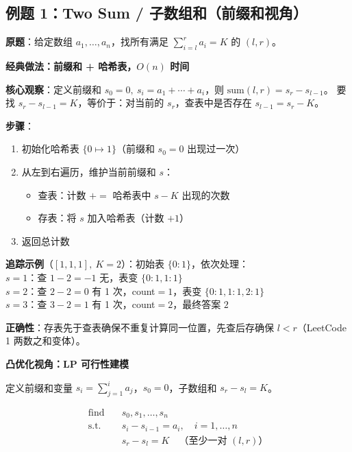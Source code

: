 \documentclass[12pt, a4paper]{ctexart}
\begin{document}
\subsection{例题 1：Two Sum / 子数组和（前缀和视角）}

\begin{blackboard}

\textbf{原题}：给定数组 $a_1, \ldots, a_n$，找所有满足 $\sum_{i=l}^{r} a_i = K$ 的 $(l,r)$。

\textbf{经典做法：前缀和 + 哈希表，$O(n)$ 时间}

\textbf{核心观察}：定义前缀和 $s_0=0,\ s_i = a_1+\cdots+a_i$，则 $\text{sum}(l,r) = s_r - s_{l-1}$。
要找 $s_r - s_{l-1} = K$，等价于：对当前的 $s_r$，查表中是否存在 $s_{l-1} = s_r - K$。

\textbf{步骤}：
\begin{enumerate}
    \item 初始化哈希表 $\{0 \mapsto 1\}$（前缀和 $s_0=0$ 出现过一次）
    \item 从左到右遍历，维护当前前缀和 $s$：
        \begin{itemize}
            \item 查表：计数 $+=$ 哈希表中 $s - K$ 出现的次数
            \item 存表：将 $s$ 加入哈希表（计数 $+1$）
        \end{itemize}
    \item 返回总计数
\end{enumerate}

\textbf{追踪示例}（$[1,1,1],\ K=2$）：初始表 $\{0\!:\!1\}$，依次处理：\\
\quad $s=1$：查 $1-2=-1$ 无，表变 $\{0\!:\!1,1\!:\!1\}$\\
\quad $s=2$：查 $2-2=0$ 有 1 次，count$=1$，表变 $\{0\!:\!1,1\!:\!1,2\!:\!1\}$\\
\quad $s=3$：查 $3-2=1$ 有 1 次，count$=2$，最终答案 $2$

\textbf{正确性}：存表先于查表确保不重复计算同一位置，先查后存确保 $l < r$（LeetCode 1 两数之和变体）。

\textbf{凸优化视角：LP 可行性建模}

定义前缀和变量 $s_i = \sum_{j=1}^{i} a_j$，$s_0 = 0$，子数组和 $s_r - s_l = K$。

\begin{align}
\text{find} \quad & s_0, s_1, \ldots, s_n \\
\text{s.t.} \quad & s_i - s_{i-1} = a_i, \quad i = 1, \ldots, n \\
& s_r - s_l = K \quad \text{（至少一对 $(l,r)$）}
\end{align}


\end{blackboard}
\end{document}
